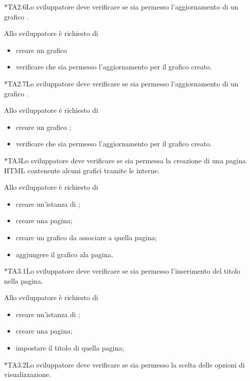 	*{TA2.6}Lo sviluppatore deve verificare se sia permesso l'aggiornamento  di un grafico .
		
		Allo sviluppatore è richiesto di
		\begin{itemize}
			\item creare un grafico 
			\item verificare che sia permesso l'aggiornamento  per il grafico creato.
		\end{itemize}

	*{TA2.7}Lo sviluppatore deve verificare se sia permesso l'aggiornamento  di un grafico .
		
		Allo sviluppatore è richiesto di
		\begin{itemize}
			\item creare un grafico ;
			\item verificare che sia permesso l'aggiornamento  per il grafico creato.
		\end{itemize}

	*{TA3}Lo sviluppatore deve verificare se sia permessa la creazione di una pagina HTML contenente alcuni grafici tramite le  interne.
		
		Allo sviluppatore è richiesto di
		\begin{itemize}
			\item creare un'istanza di \projectname{};
			\item creare una pagina;
			\item creare un grafico da associare a quella pagina;
			\item aggiungere il grafico ala pagina.
		\end{itemize}

	*{TA3.1}Lo sviluppatore deve verificare se sia permesso l'inserimento del titolo nella pagina.
		
		Allo sviluppatore è richiesto di
		\begin{itemize}
			\item creare un'istanza di \projectname{};
			\item creare una pagina;
			\item impostare il titolo di quella pagina;
		\end{itemize}

	*{TA3.2}Lo sviluppatore deve verificare se sia permesso la scelta delle opzioni di visualizzazione.
		
